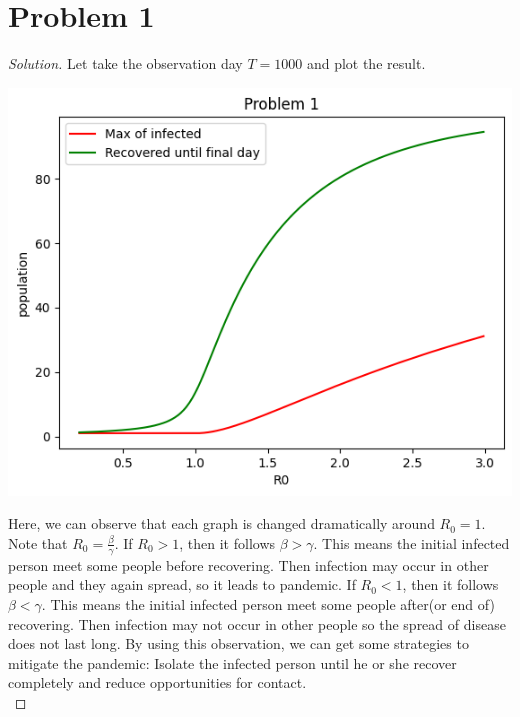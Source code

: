\section*{Problem 1}
	\begin{proof} [Solution]
		Let take the observation day $T = 1000$ and plot the result.\\
		\begin{center}
			\includegraphics[scale=0.7]{Problem1.png}
		\end{center}
		Here, we can observe that each graph is changed dramatically around $R_0 = 1$. Note that $R_0 = \frac{\beta}{\gamma}.$ If $R_0 > 1$, then it follows $\beta > \gamma$. This means the initial infected person meet some people before recovering. Then infection may occur in other people and they again spread, so it leads to pandemic. If $R_0 < 1$, then it follows $\beta < \gamma$. This means the initial infected person meet some people after(or end of) recovering. Then infection may not occur in other people so the spread of disease does not last long. By using this observation, we can get some strategies to mitigate the pandemic: Isolate the infected person until he or she recover completely and reduce opportunities for contact.\\
	\end{proof}